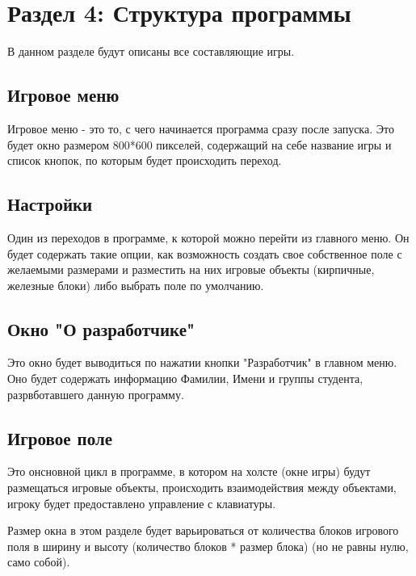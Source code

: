 \section{\label{sec:ch01/sec04}Раздел 4: Структура программы}

В данном разделе будут описаны все составляющие игры.

\subsection{\label{sec:ch01/sec04/sub01}Игровое меню}

Игровое меню - это то, с чего начинается программа сразу после запуска. Это будет окно размером 800*600 пикселей, содержащий на себе название игры и список кнопок, по которым будет происходить переход.

\subsection{\label{sec:ch01/sec04/sub02}Настройки}

Один из переходов в программе, к которой можно перейти из главного меню. Он будет содержать такие опции, как возможность создать свое собственное поле с желаемыми размерами и разместить на них игровые объекты (кирпичные, железные блоки) либо выбрать поле по умолчанию.

\subsection{\label{sec:ch01/sec04/sub03}Окно "О разработчике"}

Это окно будет выводиться по нажатии кнопки "Разработчик" в главном меню. Оно будет содержать информацию Фамилии, Имени и группы студента, разрвботавшего данную программу.

\subsection{\label{sec:ch01/sec04/sub04}Игровое поле}

Это онсновной цикл в программе, в котором на холсте (окне игры) будут размещаться игровые объекты, происходить взаимодействия между объектами, игроку будет предоставлено управление с клавиатуры.

Размер окна в этом разделе будет варьироваться от количества блоков игрового поля в ширину и высоту (количество блоков * размер блока) (но не равны нулю, само собой).